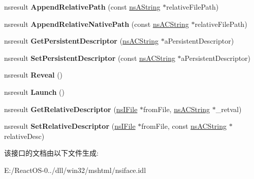 \begin{DoxyCompactItemize}
\item 
\mbox{\label{interfacens_i_file_a4d495a5d5667db0b7b947558dde48203}} 
nsresult {\bfseries Append\+Relative\+Path} (const \hyperlink{structns_string_container}{ns\+A\+String} $\ast$relative\+File\+Path)
\item 
\mbox{\label{interfacens_i_file_afa359cdc8559670684cb4215f9ff551e}} 
nsresult {\bfseries Append\+Relative\+Native\+Path} (const \hyperlink{structns_c_string_container}{ns\+A\+C\+String} $\ast$relative\+File\+Path)
\item 
\mbox{\label{interfacens_i_file_abc8b2267440949bcb3f3ecce4f136ae5}} 
nsresult {\bfseries Get\+Persistent\+Descriptor} (\hyperlink{structns_c_string_container}{ns\+A\+C\+String} $\ast$a\+Persistent\+Descriptor)
\item 
\mbox{\label{interfacens_i_file_aa888b9eba9fac229441d727d229ef7af}} 
nsresult {\bfseries Set\+Persistent\+Descriptor} (const \hyperlink{structns_c_string_container}{ns\+A\+C\+String} $\ast$a\+Persistent\+Descriptor)
\item 
\mbox{\label{interfacens_i_file_afeebd15d676d289316247129fb9bdcc7}} 
nsresult {\bfseries Reveal} ()
\item 
\mbox{\label{interfacens_i_file_a61817c8d26c07feca23a92edcca4c330}} 
nsresult {\bfseries Launch} ()
\item 
\mbox{\label{interfacens_i_file_ae5400e515a6a69c064339afa668a5584}} 
nsresult {\bfseries Get\+Relative\+Descriptor} (\hyperlink{interfacens_i_file}{ns\+I\+File} $\ast$from\+File, \hyperlink{structns_c_string_container}{ns\+A\+C\+String} $\ast$\+\_\+retval)
\item 
\mbox{\label{interfacens_i_file_a3bee63525f6050cf40714e1d9bfb578d}} 
nsresult {\bfseries Set\+Relative\+Descriptor} (\hyperlink{interfacens_i_file}{ns\+I\+File} $\ast$from\+File, const \hyperlink{structns_c_string_container}{ns\+A\+C\+String} $\ast$relative\+Desc)
\end{DoxyCompactItemize}


该接口的文档由以下文件生成\+:\begin{DoxyCompactItemize}
\item 
E\+:/\+React\+O\+S-\/0../dll/win32/mshtml/nsiface.\+idl\end{DoxyCompactItemize}

